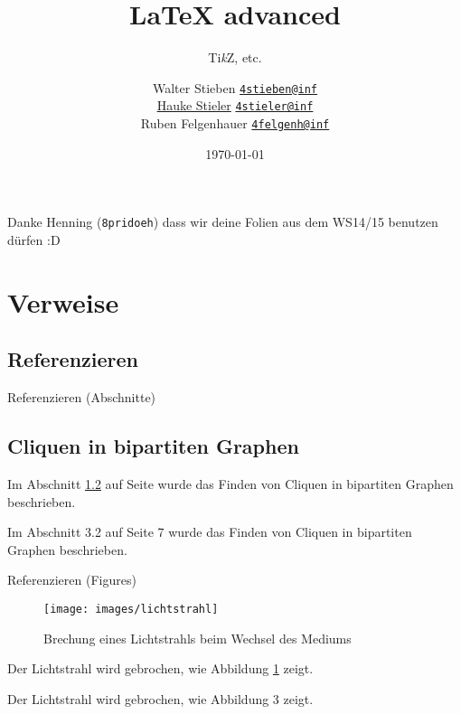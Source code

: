 \documentclass{beamer}
\title{\LaTeX{} advanced}
\subtitle{\small Ti\textit{k}Z, etc.}
\author
{
	Walter Stieben \texttt{\href{mailto:4stieben@informatik.uni-hamburg.de}{4stieben@inf}}\\
	\href{http://hauke-stieler.de/}{Hauke Stieler} \texttt{\href{mailto:4stieler@informatik.uni-hamburg.de}{4stieler@inf}}\\
  Ruben Felgenhauer \texttt{\href{mailto:4felgenh@informatik.uni-hamburg.de}{4felgenh@inf}}
}
\date{\footnotesize \today}
\begin{document}
	\maketitle


	\begin{frame}
		\begin{center}
			Danke Henning (\texttt{8pridoeh}) dass wir deine Folien aus dem WS14/15 benutzen dürfen :D
		\end{center}
	\end{frame}



		\section{Verweise}
		\subsection{Referenzieren}


		\begin{frame}[containsverbatim]{Referenzieren (Abschnitte)}
			\begin{latexcode}
\subsection{Cliquen in bipartiten Graphen}
\label{sec:cliques}

Im Abschnitt \ref{sec:cliques} auf Seite
\pageref{sec:cliques} wurde das Finden von
Cliquen in bipartiten Graphen beschrieben.
			\end{latexcode}

			\slideheading{Ergebnis:}
			Im Abschnitt 3.2 auf Seite 7 wurde das Finden
			von Cliquen in bipartiten Graphen beschrieben.
		\end{frame}


		\begin{frame}[containsverbatim]{Referenzieren (Figures)}
			\slideheading{\LaTeX-Code:}
			\begin{latexcode}
\begin{figure}[t]
	\texttt{[image: images/lichtstrahl]}
	\caption{Brechung eines Lichtstrahls beim Wechsel
			 des Mediums}
	\label{fig:lichtbrechung}
\end{figure}
Der Lichtstrahl wird gebrochen, wie
Abbildung \ref{fig:lichtbrechung} zeigt.
			\end{latexcode}

			Der Lichtstrahl wird gebrochen, wie Abbildung 3 zeigt.
		\end{frame}
\end{document}
